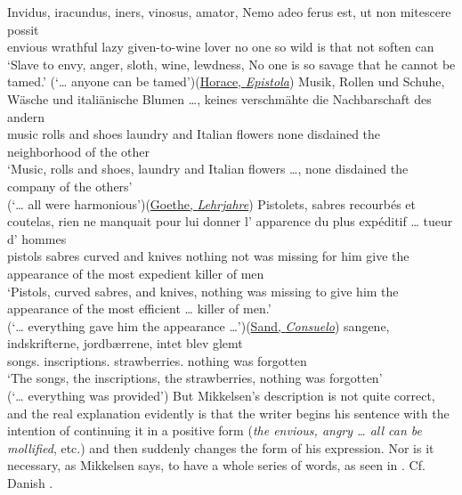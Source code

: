 \ea \label{ex:07-109}
\ea{}
\gll Invidus, iracundus, iners, vinosus, amator, Nemo adeo ferus est, ut non mitescere possit\\
 envious wrathful lazy given-to-wine lover {no one} so wild is that not soften can\\
\glt `Slave to envy, anger, sloth, wine, lewdness, No one is so savage that he cannot be tamed.' \phantom{x} (`{\dots} anyone can be tamed')\hfill(\href{https://archive.org/details/quintihoratiifl01goulgoog/page/n153/mode/2up?q=%22iracundus%22&view=theater}{Horace, \textit{Epistola}}) %
\ex 
\gll Musik, Rollen und Schuhe, Wäsche und italiänische Blumen {\dots}, keines verschmähte die Nachbarschaft des andern\\ 
 music rolls and shoes laundry and Italian flowers {} none disdained the neighborhood {of the} other\\
\glt `Music, rolls and shoes, laundry and Italian flowers {\dots}, none disdained the company of the others'\\ (`{\dots} all were harmonious')\hfill(\href{https://books.google.co.jp/books?id=IfEFAAAAQAAJ&printsec=frontcover&source=gbs_book_other_versions_r&redir_esc=y#v=snippet&q=musik%2C%20rollen&f=false}{Goethe, \textit{Lehrjahre}})
\ex {}
\gll Pistolets, sabres recourbés et coutelas, rien ne manquait pour lui donner l' apparence du plus expéditif {\dots} tueur d' hommes\\
 pistols sabres curved and knives nothing not {was missing} for him give the appearance {of the} most expedient {} killer of men\\
\glt `Pistols, curved sabres, and knives, nothing was missing to give him the appearance of the most efficient {\dots} killer of men.'\\ (`{\dots} everything gave him the appearance {\dots}')\hfill(\href{https://fr.wikisource.org/wiki/Page%3ASand_-_Consuelo_-_1856_-_tome_3.djvu/280}{Sand, \textit{Consuelo}})
\ex 
\gll sangene, indskrifterne, jordbærrene, intet blev glemt\\
 songs.\DEF{} inscriptions.\DEF{} strawberries.\DEF{} nothing was forgotten\\
\glt `The songs, the inscriptions, the strawberries, nothing was forgotten'\\(`{\dots} everything was provided') %
\z
\z
But Mikkelsen's description is not quite correct, and the real explanation evidently is that the writer begins his sentence with the intention of continuing it in a positive form (\textit{the envious, angry {\dots} all can be mollified}, etc.) and then suddenly changes the form of his expression. Nor is it necessary, as Mikkelsen says, to have a whole series of words, as seen in . Cf. Danish .

